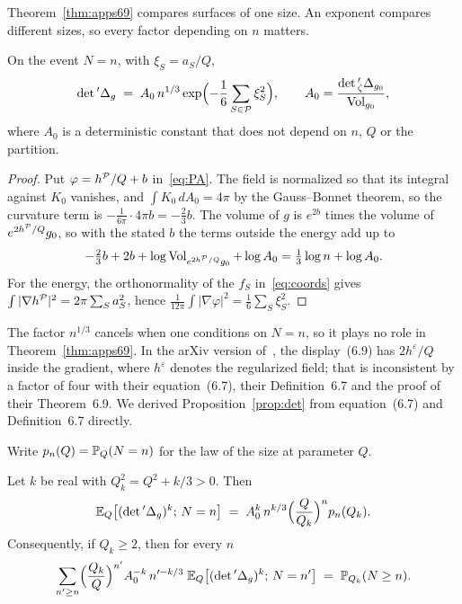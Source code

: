 Theorem~\ref{thm:apps69} compares surfaces of one size. An exponent compares different sizes, so
every factor depending on $n$ matters.

\begin{proposition}\label{prop:det}
On the event $N=n$, with $\xi_S=a_S/Q$,
\[
\det{}'\Delta_g\;=\;A_0\,n^{1/3}\exp\Bigl(-\frac16\sum_{S\in\mathcal{P}}\xi_S^2\Bigr),\qquad
A_0=\frac{\det{}'_\zeta\Delta_{g_0}}{\operatorname{Vol}_{g_0}} ,
\]
where $A_0$ is a deterministic constant that does not depend on $n$, $Q$ or the partition.
\end{proposition}

\begin{proof}
Put $\varphi=h^{\mathcal{P}}/Q+b$ in~\eqref{eq:PA}. The field is normalized so that its integral against
$K_0$ vanishes, and $\int K_0\,dA_0=4\pi$ by the Gauss--Bonnet theorem, so the curvature term is
$-\frac1{6\pi}\cdot4\pi b=-\frac23b$. The volume of $g$ is $e^{2b}$ times the volume of
$e^{2h^{\mathcal{P}}/Q}g_0$, so with the stated $b$ the terms outside the energy add up to
\[
-\tfrac23b+2b+\log\operatorname{Vol}_{e^{2h^{\mathcal{P}}/Q}g_0}+\log A_0=\tfrac13\log n+\log A_0 .
\]
For the energy, the orthonormality of the $f_S$ in~\eqref{eq:coords} gives
$\int|\nabla h^{\mathcal{P}}|^2=2\pi\sum_Sa_S^2$, hence
$\frac1{12\pi}\int|\nabla\varphi|^2=\frac1{6}\sum_S\xi_S^2$.
\end{proof}

The factor $n^{1/3}$ cancels when one conditions on $N=n$, so it plays no role in
Theorem~\ref{thm:apps69}. In the arXiv version of~\cite{APPS}, the display~(6.9) has $2h^\varepsilon/Q$
inside the gradient, where $h^\varepsilon$ denotes the regularized field; that is inconsistent by a factor of four with their equation~(6.7), their
Definition~6.7 and the proof of their Theorem~6.9. We derived Proposition~\ref{prop:det} from
equation~(6.7) and Definition~6.7 directly.

Write $p_n(Q)=\mathbb{P}_Q(N=n)$ for the law of the size at parameter $Q$.

\begin{proposition}\label{prop:identity}
Let $k$ be real with $Q_k^2=Q^2+k/3>0$. Then
\[
\mathbb{E}_Q\bigl[(\det{}'\Delta_g)^k;\,N=n\bigr]\;=\;A_0^k\,n^{k/3}\Bigl(\frac{Q}{Q_k}\Bigr)^np_n(Q_k).
\]
Consequently, if $Q_k\ge2$, then for every $n$
\begin{equation}\label{eq:identity}
\sum_{n'\ge n}\Bigl(\frac{Q_k}{Q}\Bigr)^{n'}A_0^{-k}\,n'^{-k/3}\;
\mathbb{E}_Q\bigl[(\det{}'\Delta_g)^k;\,N=n'\bigr]\;=\;\mathbb{P}_{Q_k}(N\ge n).
\end{equation}
\end{proposition}

